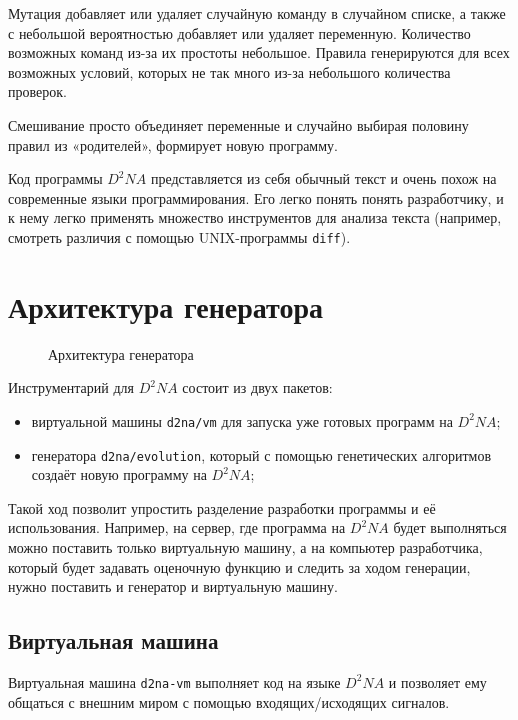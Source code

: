 \documentclass[utf8,a5paper,portrait,10pt,twoside]{eskdtext}
\begin{document}
Мутация добавляет или удаляет случайную команду в случайном списке, а также с
небольшой вероятностью добавляет или удаляет переменную. Количество возможных
команд из-за их простоты небольшое. Правила генерируются для всех возможных
условий, которых не так много из-за небольшого количества проверок.

Смешивание просто объединяет переменные и случайно выбирая половину правил из
«родителей», формирует новую программу.

Код программы $D^2NA$ представляется из себя обычный текст и очень похож на
современные языки программирования. Его легко понять понять разработчику,
и к нему легко применять множество инструментов для анализа текста (например,
смотреть различия с помощью UNIX-программы \texttt{diff}).

\newpage
\section{Архитектура генератора}

\begin{figure}
  \centering
  
  \caption{Архитектура генератора}
\end{figure}

Инструментарий для $D^2NA$ состоит из двух пакетов:
\begin{itemize}
  \item виртуальной машины \texttt{d2na/vm} для запуска уже готовых программ на
        $D^2NA$;
  \item генератора \texttt{d2na/evolution}, который с помощью генетических
        алгоритмов создаёт новую программу на $D^2NA$;
\end{itemize}

Такой ход позволит упростить разделение разработки программы и её использования.
Например, на сервер, где программа на $D^2NA$ будет выполняться можно поставить
только виртуальную машину, а на компьютер разработчика, который будет задавать
оценочную функцию и следить за ходом генерации, нужно поставить и генератор и
виртуальную машину.

\subsection{Виртуальная машина}

Виртуальная машина \texttt{d2na-vm} выполняет код на языке $D^2NA$ и позволяет
ему общаться с внешним миром с помощью входящих/исходящих сигналов.
\end{document}
